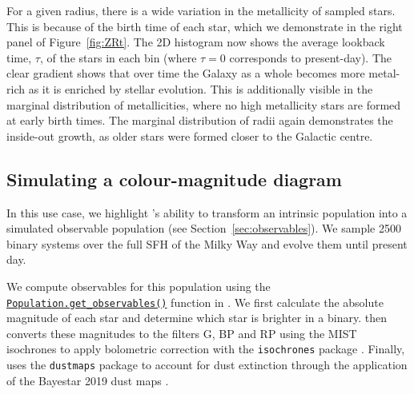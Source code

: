 \documentclass[twocolumn, twocolappendix, oneside, linenumbers]{aastex631}
\newcommand{\codestyle}[1]{{\color{codecolour} \texttt{#1}}}
\begin{document}
For a given radius, there is a wide variation in the metallicity of sampled stars. This is because of the birth time of each star, which we demonstrate in the right panel of Figure~\ref{fig:ZRt}. The 2D histogram now shows the average lookback time, $\tau$, of the stars in each bin (where $\tau = 0$ corresponds to present-day). The clear gradient shows that over time the Galaxy as a whole becomes more metal-rich as it is enriched by stellar evolution. This is additionally visible in the marginal distribution of metallicities, where no high metallicity stars are formed at early birth times. The marginal distribution of radii again demonstrates the inside-out growth, as older stars were formed closer to the Galactic centre.



\subsection{Simulating a \gaia colour-magnitude diagram}

In this use case, we highlight \cogsworth's ability to transform an intrinsic population into a simulated observable population (see Section~\ref{sec:observables}). We sample 2500 binary systems over the full SFH of the Milky Way and evolve them until present day.

We compute observables for this population using the \href{https://cogsworth.readthedocs.io/en/latest/api/cogsworth.pop.Population.html#cogsworth.pop.Population.get_observables}{\codestyle{Population.get\_observables()}} function in \cogsworth. We first calculate the absolute magnitude of each star and determine which star is brighter in a binary. \cogsworth then converts these magnitudes to the \gaia filters G, BP and RP using the MIST isochrones to apply bolometric correction with the \texttt{isochrones} package \citep{Morton+2015:2015ascl.soft03010M, Dotter+2016, Choi+2016:2016ApJ...823..102C, Paxton2011, Paxton2013, Paxton2015}. Finally, \cogsworth uses the \texttt{dustmaps} package to account for dust extinction through the application of the Bayestar 2019 dust maps \citep{2018JOSS....3..695M, Bayestar}.
\end{document}
